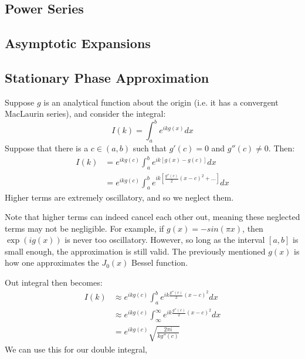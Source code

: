 \documentclass[crop=false,class=book,oneside]{standalone}
\begin{document}
        \subsection{Power Series}
        \subsection{Asymptotic Expansions}
        \subsection{Stationary Phase Approximation}
            Suppose $g$ is an analytical function about
            the origin (i.e. it has a convergent MacLaurin series),
            and consider the integral:
            \begin{equation}
                I(k) = \int_{a}^{b}e^{ikg(x)}dx
            \end{equation}
            Suppose that there is a $c\in(a,b)$ such
            that $g'(c)=0$ and $g''(c)\ne 0$. Then:
            \begin{align}
                \nonumber I(k)&=e^{ikg(c)}\int_{a}^{b}e^{ik[g(x)-g(c)]}dx\\
                &=e^{ikg(c)}\int_{a}^{b}e^{ik[\frac{g''(c)}{2}(x-c)^{2}+\hdots]}dx
            \end{align}
            Higher terms are extremely oscillatory, and so we neglect them.
            \begin{remark}
                Note that higher terms can indeed cancel each
                other out, meaning these neglected terms may
                not be negligible. For example, if
                $g(x)=-sin(\pi x)$, then $\exp(ig(x))$ is never
                too oscillatory. However, so long as the interval
                $[a,b]$ is small enough, the approximation is still
                valid. The previously mentioned $g(x)$ is how
                one approximates the $J_{0}(x)$ Bessel function.
            \end{remark}
            Out integral then becomes:
            \begin{align}
                I(k)&\approx e^{ikg(c)}\int_{a}^{b}e^{ik\frac{g''(c)}{2}(x-c)^{2}}dx\\
                &\approx e^{ikg(c)}\int_{\infty}^{\infty}e^{ik\frac{g''(c)}{2}(x-c)^{2}}dx\\
                &=e^{ikg(c)}\sqrt{\frac{2\pi i}{kg''(c)}}
            \end{align}
            We can use this for our double integral,
\end{document}
